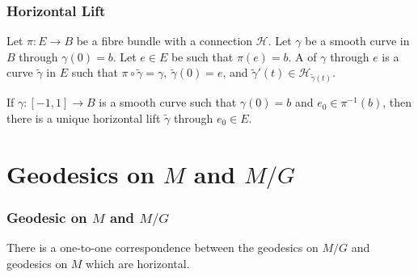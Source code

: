 \documentclass{beamer}
\begin{document}
	\begin{frame}
		\frametitle<presentation>{Horizontal Lift}
		\p
		\begin{definition}\label{defn:horizontal-lift}
			\p Let $\pi:E\to B$ be a fibre bundle with a connection $\mathcal{H}$. \p Let $\gamma$ be a smooth curve in $B$ through $\gamma(0)= b$. \p Let $e\in E$ be such that $\pi(e)=b$. \p A \emph{} of $\gamma$ through $e$ is a curve $\tilde{\gamma}$ in $E$ \p such that $\pi\circ \tilde{\gamma}=\gamma,~\tilde{\gamma}(0)= e$, \p and $\tilde{\gamma}'(t)\in \mathcal{H}_{\tilde{\gamma}(t)}$.
		\end{definition}

		\p 
		\begin{prop}
			\p If $\gamma:[-1,1]\to B$ is a smooth curve such that $\gamma(0)=b$ and $e_0 \in \pi^{-1}(b)$, \p then there is a unique horizontal lift $\tilde{\gamma}$ through $e_0\in E$.
		\end{prop}
	\end{frame}	
	

	\section{Geodesics on \texorpdfstring{$M$}{M} and \texorpdfstring{$M/G$}{M/G}}
	\begin{frame}
		\frametitle<presentation>{Geodesic on $M$ and $M/G$}
		\p 
		\begin{theorem}
			There is a one-to-one correspondence between the geodesics on $M/G$ and geodesics on $M$ which are horizontal.
		\end{theorem}
	\end{frame}
\end{document}
